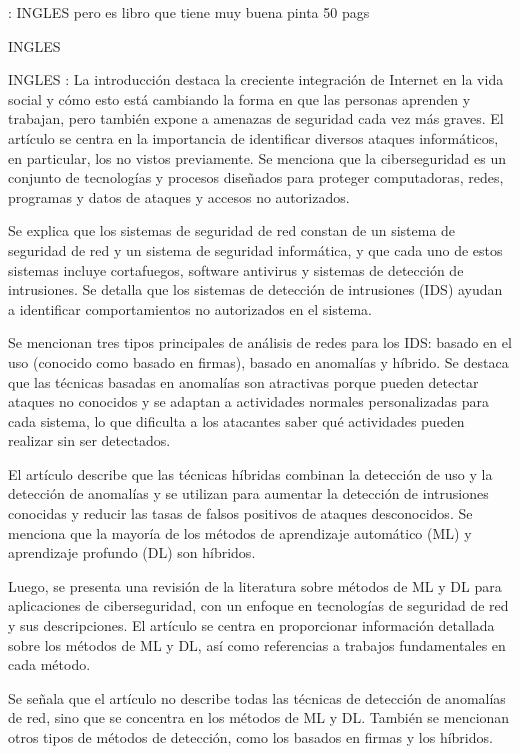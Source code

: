 \documentclass[11pt, a4paper]{article} %
\begin{document}
\citep{omar2022machine} : INGLES pero es libro que tiene muy buena pinta 50 pags

\citep{sarker2020cybersecurity} INGLES

\citep{xin2018machine} INGLES : La introducción destaca la creciente integración de Internet en la vida social y cómo esto está cambiando la forma en que las personas aprenden y trabajan, pero también expone a amenazas de seguridad cada vez más graves. El artículo se centra en la importancia de identificar diversos ataques informáticos, en particular, los no vistos previamente. Se menciona que la ciberseguridad es un conjunto de tecnologías y procesos diseñados para proteger computadoras, redes, programas y datos de ataques y accesos no autorizados.

Se explica que los sistemas de seguridad de red constan de un sistema de seguridad de red y un sistema de seguridad informática, y que cada uno de estos sistemas incluye cortafuegos, software antivirus y sistemas de detección de intrusiones. Se detalla que los sistemas de detección de intrusiones (IDS) ayudan a identificar comportamientos no autorizados en el sistema.

Se mencionan tres tipos principales de análisis de redes para los IDS: basado en el uso (conocido como basado en firmas), basado en anomalías y híbrido. Se destaca que las técnicas basadas en anomalías son atractivas porque pueden detectar ataques no conocidos y se adaptan a actividades normales personalizadas para cada sistema, lo que dificulta a los atacantes saber qué actividades pueden realizar sin ser detectados.

El artículo describe que las técnicas híbridas combinan la detección de uso y la detección de anomalías y se utilizan para aumentar la detección de intrusiones conocidas y reducir las tasas de falsos positivos de ataques desconocidos. Se menciona que la mayoría de los métodos de aprendizaje automático (ML) y aprendizaje profundo (DL) son híbridos.

Luego, se presenta una revisión de la literatura sobre métodos de ML y DL para aplicaciones de ciberseguridad, con un enfoque en tecnologías de seguridad de red y sus descripciones. El artículo se centra en proporcionar información detallada sobre los métodos de ML y DL, así como referencias a trabajos fundamentales en cada método.

Se señala que el artículo no describe todas las técnicas de detección de anomalías de red, sino que se concentra en los métodos de ML y DL. También se mencionan otros tipos de métodos de detección, como los basados en firmas y los híbridos.
\end{document}

